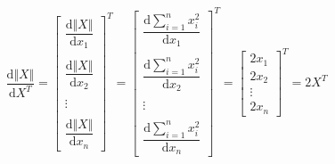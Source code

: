 \documentclass[withoutpreface,bwprint]{cumcmthesis} %
\begin{document}
	\begin{equation}
		\dfrac{\mathrm{d} \Vert X \Vert}{\mathrm{d} X^T}
		=
		\left[
		\begin{array}{c}
			\dfrac{\mathrm{d} \Vert X \Vert}{\mathrm{d} x_1}\\\\
			\dfrac{\mathrm{d} \Vert X \Vert}{\mathrm{d} x_2}\\\\
			\vdots\\\\
			\dfrac{\mathrm{d} \Vert X \Vert}{\mathrm{d} x_n}
		\end{array}
		\right]^T
		=
		\left[
		\begin{array}{c}
			\dfrac{\mathrm{d} \sum_{i=1}^{n} x_i^2}{\mathrm{d} x_1}\\\\
			\dfrac{\mathrm{d} \sum_{i=1}^{n} x_i^2}{\mathrm{d} x_2}\\\\
			\vdots\\\\
			\dfrac{\mathrm{d} \sum_{i=1}^{n} x_i^2}{\mathrm{d} x_n}
		\end{array}
		\right]^T
		=
		\left[
		\begin{array}{c}
			2x_1\\
			2x_2\\
			\vdots\\
			2x_n
		\end{array}
		\right]^T
		=
		2X^T
	\end{equation}


	
	



	
	 

	
	
	


	
	
	


	
	
	
	
	
\end{document}
